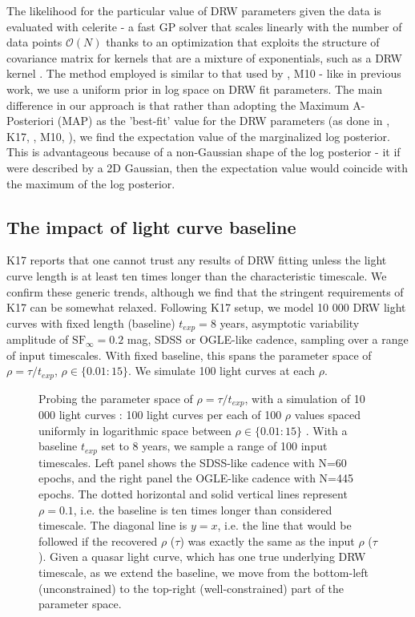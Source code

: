 \documentclass[twocolumn]{aastex62}
\newcommand{\project}[1]{\textsf{#1}}
\begin{document}
The likelihood for the particular value of DRW parameters given the data is evaluated with   \project{celerite} \citep{foreman2017} - a fast GP solver that scales linearly with the number of data points $\mathcal{O}(N)$ thanks to an optimization that exploits the structure of covariance matrix for kernels that are a mixture of exponentials, such as a DRW kernel \citep{foreman2018,ambikasaran2015}. The method employed is similar to that used by \cite{rybicki1992, kozlowski2010},  M10 - like in previous work, we use a  uniform prior in log space on DRW fit parameters. The main difference in our approach is that rather than adopting the Maximum A-Posteriori (MAP) as the 'best-fit' value for the DRW parameters (as done in \citealt{kozlowski2010}, K17, \citealt{kozlowski2016b}, M10, \citealt{macleod2011}),  we find the expectation value of the marginalized log posterior. This is advantageous because of a non-Gaussian shape of the log posterior - it if were described by a 2D Gaussian,  then the expectation value would coincide with the maximum of the log posterior.

\subsection{The impact of light curve baseline}\label{sec:baseline}

K17 reports that one cannot trust any results of DRW fitting unless the light curve length is at least ten times longer than the characteristic timescale. We confirm these generic trends, although we find that the stringent requirements of K17 can be somewhat relaxed. Following K17 setup,  we  model 10 000  DRW light curves with fixed length (baseline) $t_{exp}=8$ years, asymptotic variability amplitude of  $\mathrm{SF}_{\infty} = 0.2$ mag, SDSS or OGLE-like cadence, sampling over a range of input timescales. With fixed baseline, this spans the parameter space of $\rho = \tau / t_{exp}$, $\rho \in   \{ 0.01 : 15\}$. We simulate 100 light curves at each $\rho$. 

\begin{figure*}  %
\caption{Probing the parameter space of $\rho = \tau / t_{exp}$, with a simulation of  10 000 light curves : 100 light curves per each of 100 $\rho$ values spaced uniformly in logarithmic space between $\rho \in   \{ 0.01 : 15\}$ . With a baseline $t_{exp}$ set to 8 years,  we sample a range of 100 input timescales. Left panel shows the SDSS-like cadence with N=60 epochs, and the right panel the OGLE-like cadence with N=445 epochs. The dotted horizontal and solid vertical lines represent $\rho = 0.1$, i.e. the baseline is ten times longer than considered timescale. The diagonal line is $y=x$, i.e. the line that would be followed if the recovered  $\rho$ ($\tau$) was exactly the same as the input $\rho$ ($\tau$). Given a quasar light curve, which has one true underlying DRW timescale,  as we extend the baseline, we move from the bottom-left (unconstrained) to the top-right (well-constrained) part of the parameter space. } 
\label{fig:rho_space}
\end{figure*}
\end{document}
